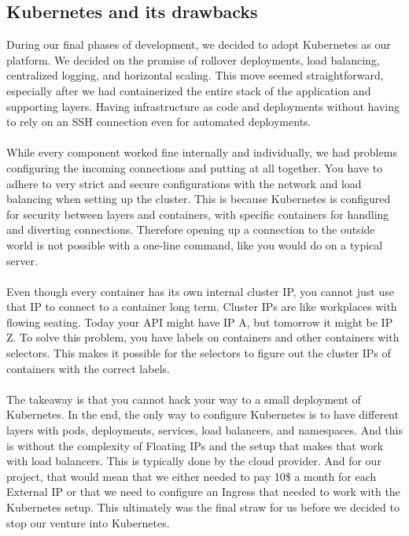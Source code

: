 \documentclass[11pt]{article}
\begin{document}
\subsection{Kubernetes and its drawbacks}
During our final phases of development, we decided to adopt Kubernetes as our platform. We decided on the promise of rollover deployments, load balancing, centralized logging, and horizontal scaling. This move seemed straightforward, especially after we had containerized the entire stack of the application and supporting layers. Having infrastructure as code and deployments without having to rely on an SSH connection even for automated deployments.
\\\\
While every component worked fine internally and individually, we had problems configuring the incoming connections and putting at all together. You have to adhere to very strict and secure configurations with the network and load balancing when setting up the cluster. This is because Kubernetes is configured for security between layers and containers, with specific containers for handling and diverting connections. Therefore opening up a connection to the outside world is not possible with a one-line command, like you would do on a typical server.
\\\\
Even though every container has its own internal cluster IP, you cannot just use that IP to connect to a container long term. Cluster IPs are like workplaces with flowing seating. Today your API might have IP A, but tomorrow it might be IP Z. To solve this problem, you have labels on containers and other containers with selectors. This makes it possible for the selectors to figure out the cluster IPs of containers with the correct labels. 
\\\\
The takeaway is that you cannot hack your way to a small deployment of Kubernetes. In the end, the only way to configure Kubernetes is to have different layers with pods, deployments, services, load balancers, and namespaces. And this is without the complexity of Floating IPs and the setup that makes that work with load balancers. This is typically done by the cloud provider. And for our project, that would mean that we either needed to pay 10\$ a month for each External IP or that we need to configure an Ingress that needed to work with the Kubernetes setup. This ultimately was the final straw for us before we decided to stop our venture into Kubernetes.   
\end{document}
